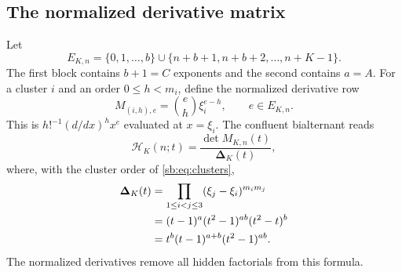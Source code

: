 \documentclass[11pt]{article}
\theoremstyle{definition}
\theoremstyle{remark}
\newcommand{\Ht}{\mathcal H}
\newcommand{\ConfDelta}{\boldsymbol\Delta}
\theoremstyle{definition}
\theoremstyle{plain}
\numberwithin{equation}{section}
\begin{document}
\subsection{The normalized derivative matrix}
Let
\begin{equation}
 E_{K,n}=\{0,1,\ldots,b\}
 \cup\{n+b+1,n+b+2,\ldots,n+K-1\}.
 \label{sb:eq:exponents}
\end{equation}
The first block contains $b+1=C$ exponents and the second contains $a=A$.
For a cluster $i$ and an order $0\le h<m_i$, define the normalized derivative
row
\begin{equation}
 M_{(i,h),e}=\binom eh\xi_i^{e-h},
 \qquad e\in E_{K,n}.
 \label{sb:eq:confluent-matrix}
\end{equation}
This is $h!^{-1}(d/dx)^hx^e$ evaluated at $x=\xi_i$.  The confluent
bialternant reads
\begin{equation}
 \Ht_K(n;t)=\frac{\det M_{K,n}(t)}{\ConfDelta_K(t)},
 \label{sb:eq:confluent-bialternant}
\end{equation}
where, with the cluster order of \eqref{sb:eq:clusters},
\begin{align}
 \ConfDelta_K(t)
 &=\prod_{1\le i<j\le3}(\xi_j-\xi_i)^{m_im_j}\notag\\
 &=(t-1)^a(t^2-1)^{ab}(t^2-t)^b\notag\\
 &=t^b(t-1)^{a+b}(t^2-1)^{ab}.
 \label{sb:eq:confluent-vandermonde}
\end{align}
The normalized derivatives remove all hidden factorials from this formula.
\end{document}
